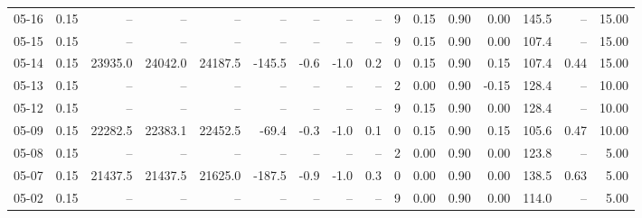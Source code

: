 \begin{threeparttable}
{\begin{tabular}{lrrrrrrrrrrrrrrr}
  05-16 &     0.15 &      -- &      -- &      -- &         -- &             -- &                       -- &                  -- &              9 &       0.15 &      0.90 &           0.00 &            145.5 &              -- &                  15.00 \\
  05-15 &     0.15 &      -- &      -- &      -- &         -- &             -- &                       -- &                  -- &              9 &       0.15 &      0.90 &           0.00 &            107.4 &              -- &                  15.00 \\
  05-14 &     0.15 & 23935.0 & 24042.0 & 24187.5 &     -145.5 &           -0.6 &                     -1.0 &                 0.2 &              0 &       0.15 &      0.90 &           0.15 &            107.4 &            0.44 &                  15.00 \\
  05-13 &     0.15 &      -- &      -- &      -- &         -- &             -- &                       -- &                  -- &              2 &       0.00 &      0.90 &          -0.15 &            128.4 &              -- &                  10.00 \\
  05-12 &     0.15 &      -- &      -- &      -- &         -- &             -- &                       -- &                  -- &              9 &       0.15 &      0.90 &           0.00 &            128.4 &              -- &                  10.00 \\
  05-09 &     0.15 & 22282.5 & 22383.1 & 22452.5 &      -69.4 &           -0.3 &                     -1.0 &                 0.1 &              0 &       0.15 &      0.90 &           0.15 &            105.6 &            0.47 &                  10.00 \\
  05-08 &     0.15 &      -- &      -- &      -- &         -- &             -- &                       -- &                  -- &              2 &       0.00 &      0.90 &           0.00 &            123.8 &              -- &                   5.00 \\
  05-07 &     0.15 & 21437.5 & 21437.5 & 21625.0 &     -187.5 &           -0.9 &                     -1.0 &                 0.3 &              0 &       0.00 &      0.90 &           0.00 &            138.5 &            0.63 &                   5.00 \\
  05-02 &     0.15 &      -- &      -- &      -- &         -- &             -- &                       -- &                  -- &              9 &       0.00 &      0.90 &           0.00 &            114.0 &              -- &                   5.00 \\

\end{tabular}}
\end{threeparttable}

